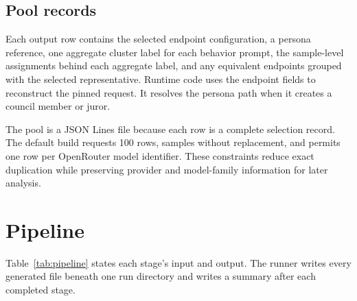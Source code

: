 \documentclass[11pt]{article}
\begin{document}
\subsection{Pool records}

Each output row contains the selected endpoint configuration, a persona reference, one aggregate cluster label for each behavior prompt, the sample-level assignments behind each aggregate label, and any equivalent endpoints grouped with the selected representative.  Runtime code uses the endpoint fields to reconstruct the pinned request.  It resolves the persona path when it creates a council member or juror.

The pool is a JSON Lines file because each row is a complete selection record.  The default build requests 100 rows, samples without replacement, and permits one row per OpenRouter model identifier.  These constraints reduce exact duplication while preserving provider and model-family information for later analysis.

\section{Pipeline}

Table~\ref{tab:pipeline} states each stage's input and output.  The runner writes every generated file beneath one run directory and writes a summary after each completed stage.
\end{document}
